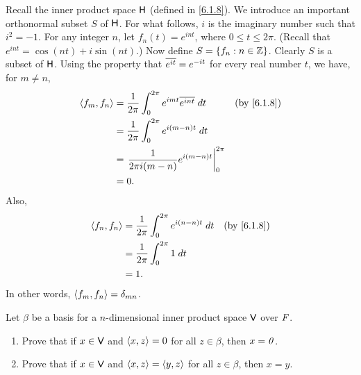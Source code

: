 \begin{eg}\label{6.1.13}
  Recall the inner product space \(\mathsf{H}\) (defined in \cref{6.1.8}).
  We introduce an important orthonormal subset \(S\) of \(\mathsf{H}\).
  For what follows, \(i\) is the imaginary number such that \(i^2 = -1\).
  For any integer \(n\), let \(f_n(t) = e^{int}\), where \(0 \leq t \leq 2 \pi\).
  (Recall that \(e^{int} = \cos(nt) + i \sin(nt)\).)
  Now define \(S = \left\lbrace f_n : n \in \mathbb{Z}\right\rbrace\).
  Clearly \(S\) is a subset of \(\mathsf{H}\).
  Using the property that \(\overline{e^{it}} = e^{-it}\) for every real number \(t\), we have, for \(m \neq n\),
  \begin{align*}
    \inn{f_m, f_n} & = \dfrac{1}{2 \pi} \int_0^{2 \pi} e^{imt} \conj{e^{int}} \; dt &  & \by{6.1.8} \\
                   & = \dfrac{1}{2 \pi} \int_0^{2 \pi} e^{i(m - n)t} \; dt                          \\
                   & = \eval{\dfrac{1}{2 \pi i(m - n)} e^{i(m - n)t}}_0^{2 \pi}                     \\
                   & = 0.
  \end{align*}
  Also,
  \begin{align*}
    \inn{f_n, f_n} & = \dfrac{1}{2 \pi} \int_0^{2 \pi} e^{i(n - n)t} \; dt &  & \by{6.1.8} \\
                   & = \dfrac{1}{2 \pi} \int_0^{2 \pi} 1 \; dt                             \\
                   & = 1.
  \end{align*}
  In other words, \(\left\langle f_m, f_n\right\rangle = \delta_{m n}\).
\end{eg}

\exercisesection

\setcounter{ex}{8}
\begin{ex}\label{ex:6.1.9}
  Let \(\beta\) be a basis for a \(n\)-dimensional inner product space \(\mathsf{V}\) over \(\mathit{F}\).
  \begin{enumerate}
    \item Prove that if \(x \in \mathsf{V}\) and \(\left\langle x, z\right\rangle = 0\) for all \(z \in \beta\), then \(x = \mathit{0}\).
    \item Prove that if \(x \in \mathsf{V}\) and \(\left\langle x, z\right\rangle = \left\langle y, z\right\rangle\) for all \(z \in \beta\), then \(x = y\).
  \end{enumerate}
\end{ex}

